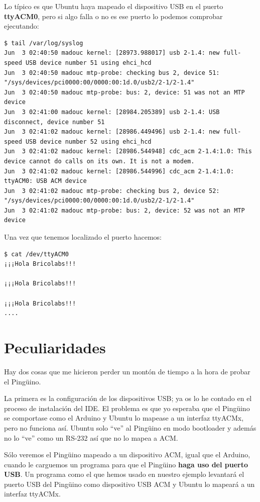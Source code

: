 \documentclass[12pt,a4paper,twoside,DIV=15]{scrartcl}
\begin{document}
Lo típico es que Ubuntu haya mapeado el dispositivo USB en el puerto
\textbf{ttyACM0}, pero si algo falla o no es ese puerto lo podemos
comprobar ejecutando:
{\tiny
\begin{verbatim}
$ tail /var/log/syslog
Jun  3 02:40:50 madouc kernel: [28973.988017] usb 2-1.4: new full-speed USB device number 51 using ehci_hcd
Jun  3 02:40:50 madouc mtp-probe: checking bus 2, device 51: "/sys/devices/pci0000:00/0000:00:1d.0/usb2/2-1/2-1.4"
Jun  3 02:40:50 madouc mtp-probe: bus: 2, device: 51 was not an MTP device
Jun  3 02:41:00 madouc kernel: [28984.205389] usb 2-1.4: USB disconnect, device number 51
Jun  3 02:41:02 madouc kernel: [28986.449496] usb 2-1.4: new full-speed USB device number 52 using ehci_hcd
Jun  3 02:41:02 madouc kernel: [28986.544948] cdc_acm 2-1.4:1.0: This device cannot do calls on its own. It is not a modem.
Jun  3 02:41:02 madouc kernel: [28986.544996] cdc_acm 2-1.4:1.0: ttyACM0: USB ACM device
Jun  3 02:41:02 madouc mtp-probe: checking bus 2, device 52: "/sys/devices/pci0000:00/0000:00:1d.0/usb2/2-1/2-1.4"
Jun  3 02:41:02 madouc mtp-probe: bus: 2, device: 52 was not an MTP device
\end{verbatim}
}

Una vez que tenemos localizado el puerto hacemos:
\begin{verbatim}
$ cat /dev/ttyACM0
¡¡¡Hola Bricolabs!!!

¡¡¡Hola Bricolabs!!!

¡¡¡Hola Bricolabs!!!
....
\end{verbatim}

\section{Peculiaridades}
\label{sec:peculiar}

Hay dos cosas que me hicieron perder un montón de tiempo a la hora de
probar el Pingüino.

La primera es la configuración de los dispositivos USB; ya os lo he
contado en el proceso de instalación del IDE. El problema es que yo
esperaba que el Pingüino se comportase como el Arduino y Ubuntu lo
mapease a un interfaz ttyACMx, pero no funciona así. Ubuntu solo
``ve'' al Pingüino en modo bootloader y además no lo ``ve'' como un
RS-232 así que no lo mapea a ACM.

Sólo veremos el Pingüino mapeado a un dispositivo ACM, igual que el
Arduino, cuando le carguemos un programa para que el Pingüino
\textbf{haga uso del puerto USB}. Un programa como el que hemos usado
en nuestro ejemplo levantará el puerto USB del Pingüino como
dispositivo USB ACM y Ubuntu lo mapeará a un interfaz ttyACMx.
\end{document}
